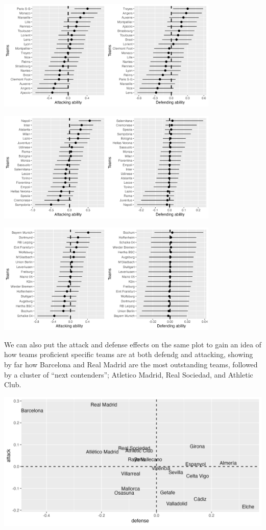 \documentclass[
]{article}
\begin{document}
\begin{center}\includegraphics[width=400px]{l1attdef} \end{center}

\begin{center}\includegraphics[width=400px]{saattdef} \end{center}

\begin{center}\includegraphics[width=400px]{buliattdef} \end{center}

We can also put the attack and defense effects on the same plot to gain
an idea of how teams proficient specific teams are at both defendg and
attacking, showing by far how Barcelona and Real Madrid are the most
outstanding teams, followed by a cluster of ``next contenders'';
Atletico Madrid, Real Sociedad, and Athletic Club.

\includegraphics[width=33.33in]{joinedllattdef}
\end{document}
